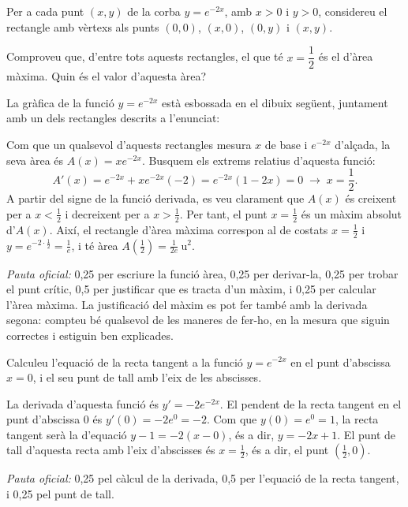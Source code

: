 Per a cada punt $(x,y)$ de la corba $y=e^{-2x}$, amb $x>0$ i $y>0$, considereu el rectangle amb vèrtexs als
punts $(0,0)$, $(x,0)$, $(0,y)$ i $(x,y)$.

\begin{apartats}

Comproveu que, d'entre tots aquests rectangles, el que té $x=\dfrac12$ és el d'àrea màxima. Quin és el valor
d'aquesta àrea?

\begin{solucio}
La gràfica de la funció $y=e^{-2x}$ està esbossada en el dibuix següent, juntament amb un dels rectangles
descrits a l'enunciat:
\begin{center}
\end{center}
Com que un qualsevol d'aquests rectangles mesura $x$ de base i $e^{-2x}$ d'alçada, la seva àrea és
$A(x)=xe^{-2x}$. Busquem els extrems relatius d'aquesta funció:
\[
A'(x)=e^{-2x}+xe^{-2x}(-2)=e^{-2x}(1-2x)=0\;\rightarrow\;x=\frac12 .
\]
A partir del signe de la funció derivada, es veu clarament que $A(x)$ és creixent per a $x<\frac12$ i decreixent
per a $x>\frac12$. Per tant, el punt $x=\frac12$ és un màxim absolut d'$A(x)$. Així, el rectangle d'àrea màxima
correspon al de costats $x=\frac12$ i $y=e^{-2\cdot\frac12}=\frac1e$, i té àrea
$A\!\left(\frac12\right)=\frac{1}{2e}\ \text{u}^2$.

\textit{Pauta oficial:} 0,25 per escriure la funció àrea, 0,25 per derivar-la, 0,25 per trobar el punt crític,
0,5 per justificar que es tracta d'un màxim, i 0,25 per calcular l'àrea màxima. La justificació del màxim es pot
fer també amb la derivada segona: compteu bé qualsevol de les maneres de fer-ho, en la mesura que siguin
correctes i estiguin ben explicades.
\end{solucio}

Calculeu l'equació de la recta tangent a la funció $y=e^{-2x}$ en el punt d'abscissa $x=0$, i el seu punt de
tall amb l'eix de les abscisses.

\begin{solucio}
La derivada d'aquesta funció és $y'=-2e^{-2x}$. El pendent de la recta tangent en el punt d'abscissa 0 és
$y'(0)=-2e^0=-2$. Com que $y(0)=e^0=1$, la recta tangent serà la d'equació $y-1=-2(x-0)$, és a dir,
$y=-2x+1$. El punt de tall d'aquesta recta amb l'eix d'abscisses és $x=\frac12$, és a dir, el punt
$\left(\frac12,0\right)$.

\textit{Pauta oficial:} 0,25 pel càlcul de la derivada, 0,5 per l'equació de la recta tangent, i 0,25 pel punt
de tall.
\end{solucio}

\end{apartats}
